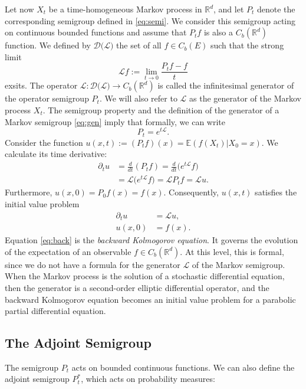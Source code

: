 \documentclass{article}
\begin{document}
Let now $X_t$ be a time-homogeneous Markov process in $\mathbb{R}^d$, and let $P_t$ denote the corresponding semigroup defined in \eqref{eq:semi}. We consider this semigroup acting on continuous bounded functions and assume that $P_t f$ is also a $C_b(\mathbb{R}^d)$ function. We defined by $\mathcal{D}(\mathcal{L)}$ the set of all $f\in C_b(E)$ such that the strong limit
\begin{equation}
    \mathcal{L}f:= \lim_{t \to 0} \frac{P_tf-f}{t} \label{eq:gen}
\end{equation}
exsits. The operator $\mathcal{L}:\mathcal{D}(\mathcal{L)}\to C_b(\mathbb{R}^d)$ is called the infinitesimal generator of the operator semigroup $P_t$. We will also refer to $\mathcal{L}$ as the generator of the Markov process $X_t$.
The semigroup property and the definition of the generator of a Markov semigroup
\eqref{eq:gen} imply that formally, we can write
$$P_t = e^{t\mathcal{L}}.$$
Consider the function $u(x,t):=(P_tf)(x) =\mathbb{E}(f(X_t)|X_0=x).$ We calculate its time derivative:
\begin{align*}
    \partial_t u &= \frac{d}{dt}(P_tf)=\frac{d}{dt}\big(e^{t\mathcal{L}}f\big)\\
    &=\mathcal{L} \big (e^{t\mathcal{L}}f \big) = \mathcal{L}P_t f =\mathcal{L}u.
\end{align*}
Furthermore, $u(x,0) = P_0 f(x)=f(x)$. Consequently, $u(x,t)$
satisfies the initial value problem
\begin{align}
    \partial_t u & =\mathcal{L}u,\\
    u(x,0)&= f(x).
    \label{eq:back}
\end{align}
Equation \eqref{eq:back} is the \textit{backward Kolmogorov equation}. It governs the evolution of the expectation of an observable $f \in C_b(\mathbb{R}^d)$. At this level, this is formal, since we do not have a formula for the generator $\mathcal{L}$ of the Markov semigroup. When the Markov process is the solution of a stochastic differential equation, then the generator is a second-order elliptic differential operator, and the backward Kolmogorov equation becomes an initial value problem for a parabolic partial differential equation.

\subsection*{The Adjoint Semigroup}
The semigroup $P_t$ acts on bounded continuous functions. We can also define the adjoint semigroup $P_t^*$, which acts on probability measures:
\end{document}

